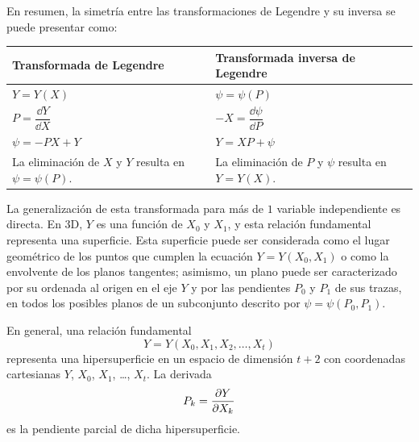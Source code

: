 En resumen, la simetría entre las transformaciones de Legendre y su inversa se puede presentar como:
\begin{center}
  \renewcommand{\arraystretch}{1.3}
  \begin{tabular}{p{}|p{}}
    \textbf{Transformada de Legendre} & \textbf{Transformada inversa de Legendre}\\
    \hline
    $Y=Y(X)$ & $\psi=\psi(P)$\\
    $P=\dfrac{\dd Y}{\dd X}$ & $-X=\dfrac{\dd\psi}{\dd P}$\\
    $\psi=-PX+Y$ & $Y=XP+\psi$\\
    La eliminación de $X$ y $Y$ resulta en $\psi=\psi(P)$. & La eliminación de $P$ y $\psi$ resulta en $Y=Y(X)$.
  \end{tabular}
\end{center}

La generalización de esta transformada para más de $1$ variable independiente es directa. En $3$D,
$Y$ es una función de $X_0$ y $X_1$, y esta relación fundamental representa una superficie. Esta
superficie puede ser considerada como el lugar geométrico de los puntos que cumplen la ecuación
$Y=Y(X_0,X_1)$ o como la envolvente de los planos tangentes; asimismo, un plano puede ser
caracterizado por su ordenada al origen en el eje $Y$ y por las pendientes $P_0$ y $P_1$ de sus
trazas, en todos los posibles planos de un subconjunto descrito por $\psi=\psi(P_0,P_1)$.

En general, una relación fundamental
\begin{equation*}
  Y=Y(X_0,X_1,X_2,\dots,X_t)
\end{equation*}
representa una hipersuperficie en un espacio de dimensión $t+2$ con coordenadas cartesianas
$Y$, $X_0$, $X_1$, \dots, $X_t$. La derivada
\begin{equation*}
  P_k=\pdv{Y}{X_k}
\end{equation*}
es la pendiente parcial de dicha hipersuperficie.

